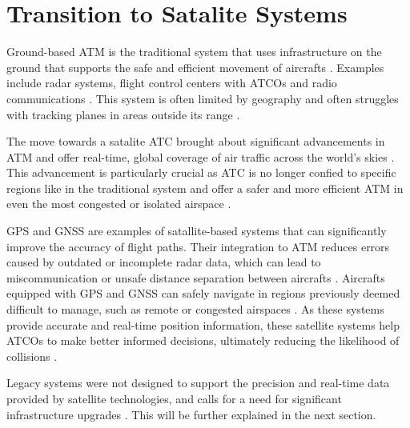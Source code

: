 \section{Transition to Satalite Systems}

Ground-based \gls{ATM} is the traditional system that uses infrastructure on the ground that supports the safe and efficient movement of aircrafts \cite{skybraryATM}.
Examples include radar systems, flight control centers with \glspl{ATCO} and radio communications \cite{atmexcite2025satellite}.
This system is often limited by geography and often struggles with tracking planes in areas outside its range \cite{atmexcite2025satellite}.

The move towards a satalite \gls{ATC} brought about significant advancements in \gls{ATM} and offer real-time, global coverage of air traffic across the world's skies \cite{atmexcite2025satellite}.
This advancement is particularly crucial as \gls{ATC} is no longer confied to specific regions like in the traditional system and offer a safer and more efficient \gls{ATM} in even the most congested or isolated airspace \cite{atmexcite2025satellite}.

\gls{GPS} and \gls{GNSS} are examples of satallite-based systems that can significantly improve the accuracy of flight paths.
Their integration to \gls{ATM} reduces errors caused by outdated or incomplete radar data, which can lead to miscommunication or unsafe distance separation between aircrafts \cite{atmexcite2025satellite}. 
Aircrafts equipped with \gls{GPS} and \gls{GNSS} can safely navigate in regions previously deemed difficult to manage, such as remote or congested airspaces \cite{atmexcite2025satellite}. 
As these systems provide accurate and real-time position information, these satellite systems help \glspl{ATCO} to make better informed decisions, ultimately reducing the likelihood of collisions \cite{atmexcite2025satellite}. 

Legacy systems were not designed to support the precision and real-time data provided by satellite technologies, and calls for a need for significant infrastructure upgrades \cite{atmexcite2025satellite}. 
This will be further explained in the next section.